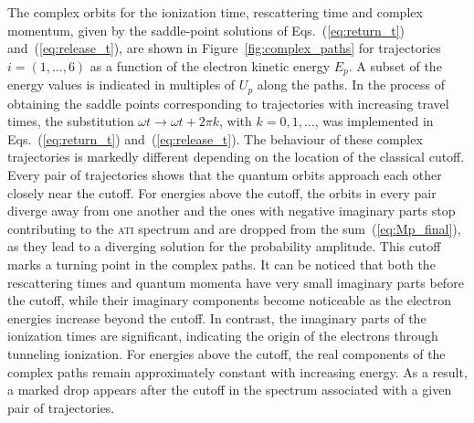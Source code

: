 


The complex orbits for the ionization time, rescattering time and
complex momentum, given by the saddle-point solutions of
Eqs.~(\ref{eq:return_t}) and~(\ref{eq:release_t}), are shown in
Figure~\ref{fig:complex_paths} for trajectories $i = (1,\dots,6)$ as a
function of the electron kinetic energy $E_{p}$. A subset of the
energy values is indicated in multiples of $U_{p}$ along the paths. In
the process of obtaining the saddle points corresponding to
trajectories with increasing travel times, the substitution $\omega t
\to \omega t + 2\pi k$, with $k = 0,1,\dots$, was implemented in
Eqs.~(\ref{eq:return_t}) and~(\ref{eq:release_t}). The behaviour of
these complex trajectories is markedly different depending on the
location of the classical cutoff. Every pair of trajectories shows
that the quantum orbits approach each other closely near the
cutoff. For energies above the cutoff, the orbits in every pair
diverge away from one another and the ones with negative imaginary
parts stop contributing to the \textsc{ati} spectrum and are dropped
from the sum~(\ref{eq:Mp_final}), as they lead to a diverging solution
for the probability amplitude. This cutoff marks a turning point in
the complex paths. It can be noticed that both the rescattering times
and quantum momenta have very small imaginary parts before the cutoff,
while their imaginary components become noticeable as the electron
energies increase beyond the cutoff. In contrast, the imaginary parts
of the ionization times are significant, indicating the origin of the
electrons through tunneling ionization. For energies above the cutoff,
the real components of the complex paths remain approximately constant
with increasing energy. As a result, a marked drop appears after the
cutoff in the spectrum associated with a given pair of trajectories.

